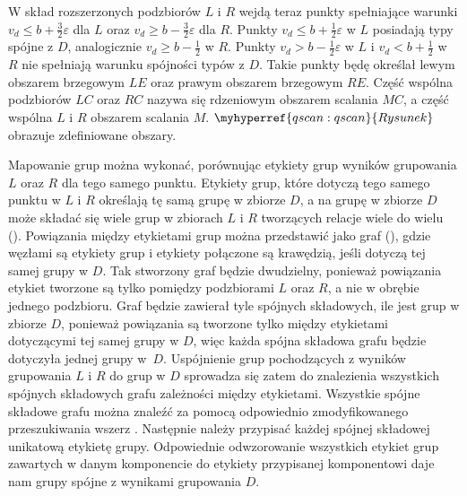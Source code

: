 W skład rozszerzonych podzbiorów $ L $ i $ R $ wejdą teraz punkty spełniające warunki $ v_d \le b + \frac{3}{2}\varepsilon $ dla $ L $ oraz $ v_d \ge b - \frac{3}{2}\varepsilon $ dla $ R $. Punkty $ v_d \le b + \frac{1}{2}\varepsilon $ w $ L $ posiadają typy spójne z $ D $, analogicznie $ v_d \ge b - \frac{1}{2} $ w $ R $. Punkty $ v_d > b - \frac{1}{2}\varepsilon $ w $ L $ i $ v_d < b + \frac{1}{2} $ w $ R $ nie spełniają warunku spójności typów z $ D $. Takie punkty będę określał lewym obszarem brzegowym $ LE $ oraz prawym obszarem brzegowym $ RE $. Część wspólna podzbiorów $ LC $ oraz $ RC $ nazywa się rdzeniowym obszarem scalania $ MC $, a część wspólna $ L $ i $ R $ obszarem scalania $ M $. $ \myhyperref{qscan:qscan}{Rysunek} $ obrazuje zdefiniowane obszary.\par

Mapowanie grup można wykonać, porównując etykiety grup wyników grupowania $ L $ oraz $ R $ dla tego samego punktu. Etykiety grup, które dotyczą tego samego punktu w $ L $ i $ R $ określają tę samą grupę w zbiorze $ D $, a na grupę w zbiorze $ D $ może składać się wiele grup w zbiorach $ L $ i $ R $ tworzących relacje wiele do wielu (). Powiązania między etykietami grup można przedstawić jako graf (), gdzie węzłami są etykiety grup i etykiety połączone są krawędzią, jeśli dotyczą tej samej grupy w $ D $. Tak stworzony graf będzie dwudzielny, ponieważ powiązania etykiet tworzone są tylko pomiędzy podzbiorami $ L $ oraz $ R $, a nie w obrębie jednego podzbioru. Graf będzie zawierał tyle spójnych składowych, ile jest grup w zbiorze $ D $, ponieważ powiązania są tworzone tylko między etykietami dotyczącymi tej samej grupy w $ D $, więc każda spójna składowa grafu będzie dotyczyła jednej grupy \mbox{w $ D $}. Uspójnienie grup pochodzących z wyników grupowania $ L $ i $ R $ do grup w $ D $ sprowadza się zatem do znalezienia wszystkich spójnych składowych grafu zależności między etykietami. Wszystkie spójne składowe grafu można znaleźć za pomocą odpowiednio zmodyfikowanego przeszukiwania wszerz \cite{connectedcomponentsbfs}. Następnie należy przypisać każdej spójnej składowej unikatową etykietę grupy. Odpowiednie odwzorowanie wszystkich etykiet grup zawartych w danym komponencie do etykiety przypisanej komponentowi daje nam grupy spójne z wynikami grupowania $ D $.\par



